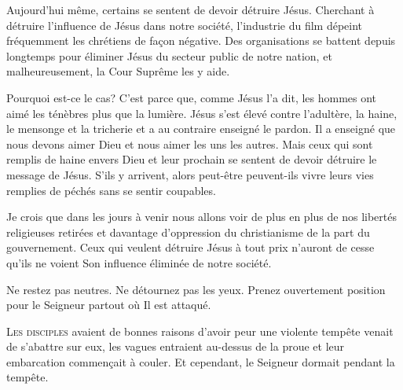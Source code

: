 Aujourd'hui même, certains se sentent de devoir détruire Jésus.
 Cherchant à détruire l'influence de Jésus dans notre société,
 l'industrie du film dépeint fréquemment les chrétiens de fa\c{c}on négative.
 Des organisations se battent depuis longtemps pour éliminer
 Jésus du secteur public de notre nation, et malheureusement,
 la Cour Suprême
  les y aide.


Pourquoi est-ce le cas? C'est parce que, comme Jésus l'a dit,
 les hommes ont aimé les ténèbres plus que la lumière.
 Jésus s'est élevé contre l'adultère, la haine, le mensonge
 et la tricherie et a au contraire enseigné le pardon.
 Il a enseigné que nous devons aimer Dieu et nous aimer les uns les autres.
 Mais ceux qui sont remplis de haine envers Dieu et leur prochain
 se sentent de devoir détruire le message de Jésus.
 S'ils y arrivent, alors peut-être peuvent-ils vivre leurs vies
 remplies de péchés sans se sentir coupables.

Je crois que dans les jours à venir nous allons voir de plus en plus
 de nos libertés religieuses retirées et davantage d'oppression
 du christianisme 
 de la part du gouvernement.
 Ceux qui veulent détruire Jésus à tout prix n'auront de cesse
 qu'ils ne voient Son influence éliminée de notre société.

Ne restez pas neutres. Ne détournez pas les yeux.
 Prenez ouvertement position pour le Seigneur partout où Il est attaqué.

\dvrule






\lettrine{L}{es disciples} avaient de bonnes raisons d'avoir peur\frcolon{}
 une violente tempête venait de s'abattre sur eux,
 les vagues entraient au-dessus de la proue et leur embarcation
 commen\c{c}ait à couler. Et cependant, le Seigneur dormait pendant la tempête.

